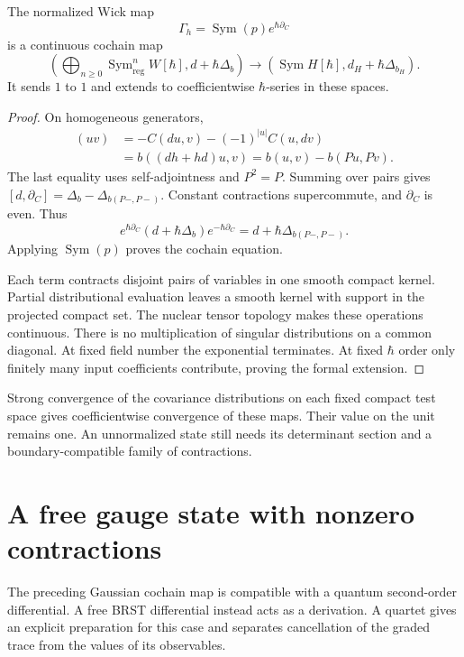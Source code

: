 \begin{proposition}\label{mht:prop:continuous-wick-state}
The normalized Wick map
\[
 \Gamma_h=\operatorname{Sym}(p)e^{\hbar\partial_C}
\]
is a continuous cochain map
\[
 \left(\bigoplus_{n\geq0}\operatorname{Sym}_{\mathrm{reg}}^nW[\hbar],
                                      d+\hbar\Delta_b\right)
 \longrightarrow
 \left(\operatorname{Sym}H[\hbar],d_H+\hbar\Delta_{b_H}\right).
\]
It sends $1$ to $1$ and extends to coefficientwise
$\hbar$-series in these spaces.
\end{proposition}

\begin{proof}
On homogeneous generators,
\begin{align*}
 [d,\partial_C](uv)
   &=-C(du,v)-(-1)^{|u|}C(u,dv)\\
   &=b((dh+hd)u,v)=b(u,v)-b(Pu,Pv).
\end{align*}
The last equality uses self-adjointness and $P^2=P$.
Summing over pairs gives
$[d,\partial_C]=\Delta_b-\Delta_{b(P-,P-)}$.
Constant contractions supercommute, and $\partial_C$ is even.
Thus
\[
 e^{\hbar\partial_C}(d+\hbar\Delta_b)e^{-\hbar\partial_C}
          =d+\hbar\Delta_{b(P-,P-)}.
\]
Applying $\operatorname{Sym}(p)$ proves the cochain equation.

Each term contracts disjoint pairs of variables in one smooth
compact kernel. Partial distributional evaluation leaves a
smooth kernel with support in the projected compact set.
The nuclear tensor topology makes these operations continuous.
There is no multiplication of singular distributions on a
common diagonal. At fixed field number the exponential
terminates. At fixed $\hbar$ order only finitely many input
coefficients contribute, proving the formal extension.
\end{proof}

Strong convergence of the covariance distributions on each
fixed compact test space gives coefficientwise convergence
of these maps. Their value on the unit remains one.
An unnormalized state still needs its determinant section
and a boundary-compatible family of contractions.

\section{A free gauge state with nonzero contractions}

The preceding Gaussian cochain map is compatible with a quantum
second-order differential. A free BRST differential instead
acts as a derivation. A quartet gives an explicit preparation
for this case and separates cancellation of the graded trace
from the values of its observables.

